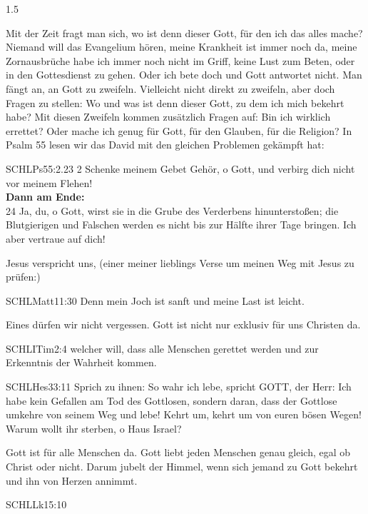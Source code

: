 \documentclass[fontsize=14pt]{../../inc/mybib}
\begin{document}
\begin{spacing}{1.5}
\begin{block}
        Mit der Zeit fragt man sich, wo ist denn dieser Gott, für den ich das alles mache? Niemand will das Evangelium hören, meine Krankheit ist immer noch da, meine Zornausbrüche habe ich immer noch nicht im Griff, keine Lust zum Beten, oder in den Gottesdienst zu gehen. Oder ich bete doch und Gott antwortet nicht. Man fängt an, an Gott zu zweifeln. Vielleicht nicht direkt zu zweifeln, aber doch Fragen zu stellen: \frqq Wo und was ist denn dieser Gott, zu dem ich mich bekehrt habe?\frqq{} Mit diesen Zweifeln kommen zusätzlich Fragen auf: Bin ich wirklich errettet? Oder mache ich genug für Gott, für den Glauben, für die Religion?
        In Psalm 55 lesen wir das David mit den gleichen Problemen gekämpft hat:
        \begin{bibelbox}{SCHL}{Ps}{55:2.23}
        2 Schenke meinem Gebet Gehör, o Gott, und verbirg dich nicht vor meinem Flehen!
        \\
        \textbf{Dann am Ende:}
        \\
        24 Ja, du, o Gott, wirst sie in die Grube des Verderbens hinunterstoßen; die Blutgierigen und Falschen werden es nicht bis zur Hälfte ihrer Tage bringen. Ich aber vertraue auf dich!
        \end{bibelbox}        
        Jesus verspricht uns, (einer meiner lieblings Verse um meinen Weg mit Jesus zu prüfen:)
        \begin{bibelbox}{SCHL}{Matt}{11:30}
            Denn mein Joch ist sanft und meine Last ist leicht.
        \end{bibelbox}
        \begin{block}       
        Eines dürfen wir nicht vergessen. Gott ist nicht nur exklusiv für uns Christen da. 
        \begin{bibelbox}{SCHL}{ITim}{2:4}
        welcher will, dass alle Menschen gerettet werden und zur Erkenntnis der Wahrheit kommen.
        \end{bibelbox}
        \begin{bibelbox}{SCHL}{Hes}{33:11}
        Sprich zu ihnen: So wahr ich lebe, spricht GOTT, der Herr: Ich habe kein Gefallen am Tod des Gottlosen, sondern daran, dass der Gottlose umkehre von seinem Weg und lebe! Kehrt um, kehrt um von euren bösen Wegen! Warum wollt ihr sterben, o Haus Israel?
        \end{bibelbox}
        Gott ist für alle Menschen da. Gott liebt jeden Menschen genau gleich, egal ob Christ oder nicht. Darum jubelt der Himmel, wenn sich jemand zu Gott bekehrt und ihn von Herzen annimmt.
        \begin{bibelbox}{SCHL}{Lk}{15:10}

\end{bibelbox}
\end{block}
\end{block}
\end{spacing}
\end{document}

